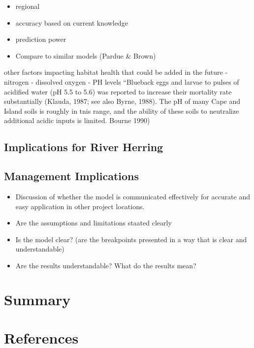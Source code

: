 \documentclass[
]{book}
\providecommand{\tightlist}{%
  \setlength{\itemsep}{0pt}\setlength{\parskip}{0pt}}
\begin{document}
\begin{itemize}
\item
  regional
\item
  accuracy based on current knowledge
\item
  prediction power
\item
  Compare to similar models (Pardue \& Brown)
\end{itemize}

other factors impacting habitat health that could be added in the future
- nitrogen
- dissolved oxygen
- PH levels
``Blueback eggs and larvae to pulses of acidified water
(pH 5.5 to 5.6) was reported to increase their
mortality rate substantially (Klauda, 1987; see also
Byrne, 1988). The pH of many Cape and Island soils is
roughly in tnis range, and the ability of these soils
to neutralize additional acidic inputs is limited. Bourne 1990)

\hypertarget{implications-for-river-herring}{%
\section{Implications for River Herring}\label{implications-for-river-herring}}

\hypertarget{management-implications}{%
\section{Management Implications}\label{management-implications}}

\begin{itemize}
\tightlist
\item
  Discussion of whether the model is communicated effectively for accurate and easy application in other project locations.
\item
  Are the assumptions and limitations staated clearly
\item
  Is the model clear? (are the breakpoints presented in a way that is clear and understandable)
\item
  Are the results understandable? What do the results mean?
\end{itemize}

\hypertarget{summary}{%
\chapter{Summary}\label{summary}}

\hypertarget{references}{%
\chapter*{References}\label{references}}
\end{document}

